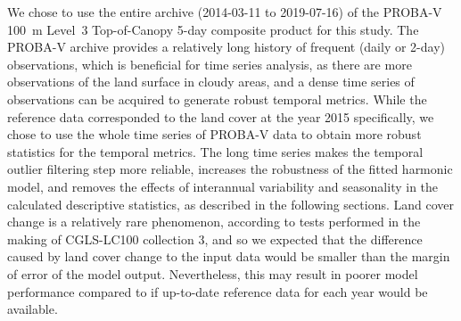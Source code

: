 \documentclass[review,authoryear,3p]{elsarticle}
\begin{document}
We chose to use the entire archive (2014-03-11 to 2019-07-16) of the PROBA-V 100~m Level~3 Top-of-Canopy 5-day composite product \citep{dierckx2014probav,probavguide2} for this study.
The PROBA-V archive provides a relatively long history of frequent (daily or 2-day) observations, which is beneficial for time series analysis, as there are more observations of the land surface in cloudy areas, and a dense time series of observations can be acquired to generate robust temporal metrics.
While the reference data corresponded to the land cover at the year 2015 specifically, we chose to use the whole time series of PROBA-V data to obtain more robust statistics for the temporal metrics.
The long time series makes the temporal outlier filtering step more reliable, increases the robustness of the fitted harmonic model, and removes the effects of interannual variability and seasonality in the calculated descriptive statistics, as described in the following sections.
Land cover change is a relatively rare phenomenon, according to tests performed in the making of \gls{CGLS-LC100} collection 3, and so we expected that the difference caused by land cover change to the input data would be smaller than the margin of error of the model output.
Nevertheless, this may result in poorer model performance compared to if up-to-date reference data for each year would be available.
\end{document}
